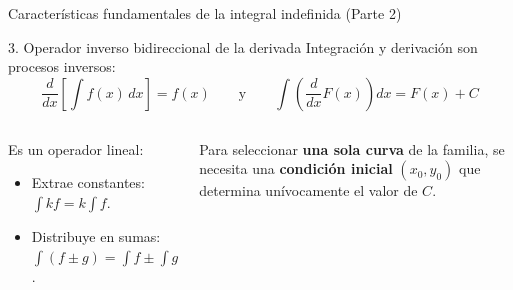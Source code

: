 \documentclass[aspectratio=169,11pt]{beamer}
\begin{document}
\begin{frame}{Características fundamentales de la integral indefinida (Parte 2)}
\small
\begin{block}{3. Operador inverso bidireccional de la derivada}
Integración y derivación son procesos inversos:
\[
\frac{d}{dx}\left[ \int f(x)\,dx \right] = f(x) \qquad \text{y} \qquad \int \left( \frac{d}{dx} F(x) \right) dx = F(x) + C
\]
\end{block}
\vspace{0.06cm}
\begin{columns}[T,onlytextwidth]
\begin{techbox}[title=4. Linealidad estricta]
\footnotesize
Es un operador lineal:
\begin{itemize}[itemsep=1pt]
  \item Extrae constantes: $\int k f = k\int f$.
  \item Distribuye en sumas: $\int(f\pm g) = \int f \pm \int g$.
\end{itemize}
\end{techbox}
\begin{keybox}[title=5. Unicidad por PVI]
\footnotesize
Para seleccionar \textbf{una sola curva} de la familia, se necesita una \textbf{condición inicial} $(x_0, y_0)$ que determina unívocamente el valor de $C$.
\end{keybox}
\end{columns}
\end{frame}
\end{document}
